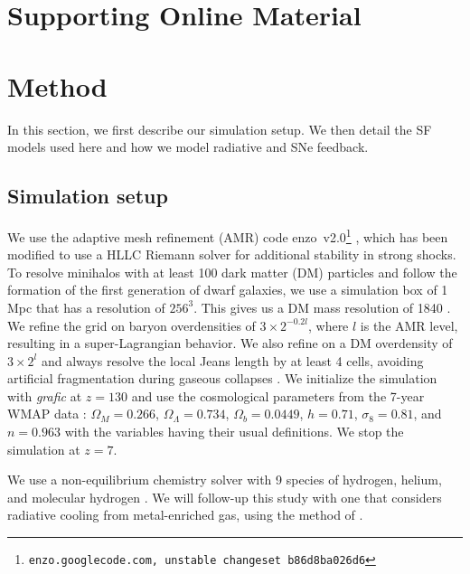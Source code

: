 \documentclass[12pt]{article}
\newcommand{\Ms}{\ifmmode{M_\odot}\else{$M_\odot$}\fi}
\begin{document}
 


\baselineskip24pt


\section*{Supporting Online Material}

\section*{Method}
\label{sec:setup}

In this section, we first describe our simulation setup.  We then
detail the SF models used here and how we model radiative and SNe
feedback.

\subsection*{Simulation setup}

We use the adaptive mesh refinement (AMR) code
enzo~v2.0\footnote{\texttt{enzo.googlecode.com, unstable changeset
b86d8ba026d6}} \cite{BryanNorman1997, OShea2004}, which has been modified to
use a HLLC Riemann solver \cite{Toro94_HLLC} for additional stability in strong
shocks.  To resolve minihalos with at least 100 dark matter (DM) particles and
follow the formation of the first generation of dwarf galaxies, we use a
simulation box of 1 Mpc that has a resolution of $256^3$.  This gives us a DM
mass resolution of 1840 \Ms.  We refine the grid on baryon overdensities of $3
\times 2^{-0.2l}$, where $l$ is the AMR level, resulting in a super-Lagrangian
behavior.  We also refine on a DM overdensity of $3 \times 2^l$ and always
resolve the local Jeans length by at least 4 cells, avoiding artificial
fragmentation during gaseous collapses \cite{Truelove97}.  We initialize the
simulation with \textsl{grafic} \cite{Bertschinger01} at $z = 130$ and use the
cosmological parameters from the 7-year WMAP data \cite{WMAP7}: $\Omega_M =
0.266$, $\Omega_\Lambda = 0.734$, $\Omega_b = 0.0449$, $h = 0.71$, $\sigma_8 =
0.81$, and $n = 0.963$ with the variables having their usual definitions.  We
stop the simulation at $z=7$.

We use a non-equilibrium chemistry solver with 9 species of hydrogen,
helium, and molecular hydrogen \cite{Abel97}.  We will follow-up this
study with one that considers radiative cooling from metal-enriched
gas, using the method of \cite{2008MNRAS.385.1443S}.
\end{document}
